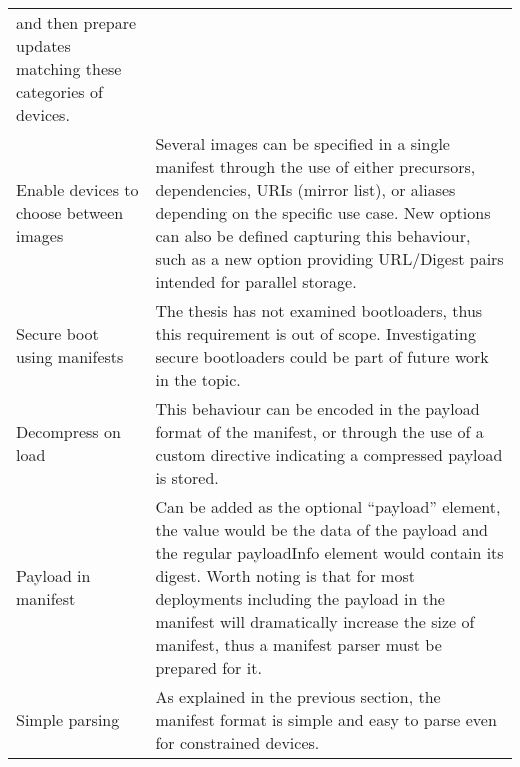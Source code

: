 \begin{longtable}[]{@{}ll@{}}
\begin{minipage}[t]{0.53\columnwidth}
and then prepare updates matching these categories of devices.\strut
\end{minipage}\tabularnewline
\begin{minipage}[t]{0.41\columnwidth}\raggedright\strut
Enable devices to choose between images\strut
\end{minipage} & \begin{minipage}[t]{0.53\columnwidth}\raggedright\strut
Several images can be specified in a single manifest through the use of
either precursors, dependencies, URIs (mirror list), or aliases
depending on the specific use case. New options can also be defined
capturing this behaviour, such as a new option providing URL/Digest
pairs intended for parallel storage.\strut
\end{minipage}\tabularnewline
\begin{minipage}[t]{0.41\columnwidth}\raggedright\strut
Secure boot using manifests\strut
\end{minipage} & \begin{minipage}[t]{0.53\columnwidth}\raggedright\strut
The thesis has not examined bootloaders, thus this requirement is out of
scope. Investigating secure bootloaders could be part of future work in
the topic.\strut
\end{minipage}\tabularnewline
\begin{minipage}[t]{0.41\columnwidth}\raggedright\strut
Decompress on load\strut
\end{minipage} & \begin{minipage}[t]{0.53\columnwidth}\raggedright\strut
This behaviour can be encoded in the payload format of the manifest, or
through the use of a custom directive indicating a compressed payload is
stored.\strut
\end{minipage}\tabularnewline
\begin{minipage}[t]{0.41\columnwidth}\raggedright\strut
Payload in manifest\strut
\end{minipage} & \begin{minipage}[t]{0.53\columnwidth}\raggedright\strut
Can be added as the optional ``payload'' element, the value would be the
data of the payload and the regular payloadInfo element would contain
its digest. Worth noting is that for most deployments including the
payload in the manifest will dramatically increase the size of manifest,
thus a manifest parser must be prepared for it.\strut
\end{minipage}\tabularnewline
\begin{minipage}[t]{0.41\columnwidth}\raggedright\strut
Simple parsing\strut
\end{minipage} & \begin{minipage}[t]{0.53\columnwidth}\raggedright\strut
As explained in the previous section, the manifest format is simple and
easy to parse even for constrained devices.\strut
\end{minipage}\tabularnewline
\bottomrule
\end{longtable}
